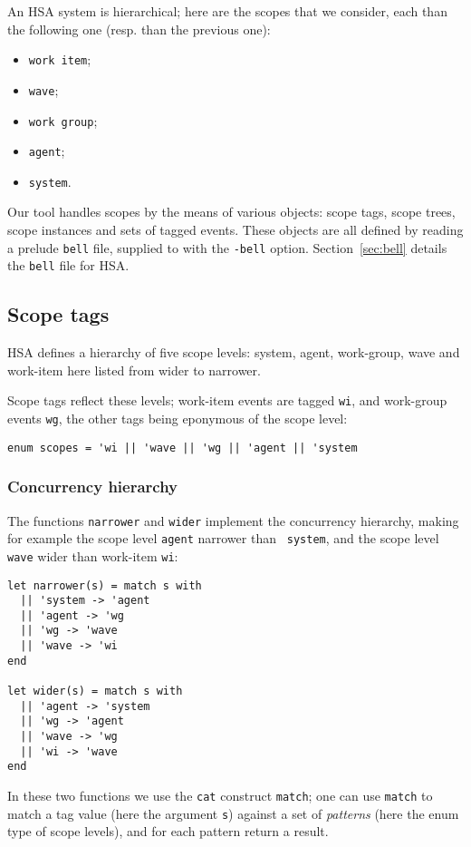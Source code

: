 An HSA system is hierarchical; here are the scopes that we consider, each
\narrower{} than the following one (resp. \wider{} than the previous one):
\begin{itemize}
\item {\tt work item};
\item {\tt wave};
\item {\tt work group};
\item {\tt agent};
\item {\tt system}. 
\end{itemize} 

Our  tool handles scopes by the means of various objects: scope
tags, scope trees, scope instances and sets of tagged events. These objects are
all defined by reading a prelude {\tt bell} file, supplied to \herd{} with the
\texttt{-bell} option. Section~\ref{sec:bell} details the {\tt bell} file for
HSA.

\subsection{Scope tags}
HSA defines a hierarchy of five scope levels: system, agent, work-group, wave
and work-item here listed from wider to narrower.

Scope tags reflect these levels; work-item events are tagged {\tt wi}, and
work-group events {\tt wg}, the other tags being eponymous of the scope level:
\begin{verbatim}
enum scopes = 'wi || 'wave || 'wg || 'agent || 'system
\end{verbatim}

\subsubsection{Concurrency hierarchy}

The functions {\tt narrower} and {\tt wider} implement the concurrency
hierarchy, making for example the scope level {\tt agent} narrower than {\tt
system}, and the scope level {\tt wave} wider than work-item {\tt wi}:
\begin{verbatim}
let narrower(s) = match s with
  || 'system -> 'agent
  || 'agent -> 'wg
  || 'wg -> 'wave
  || 'wave -> 'wi
end

let wider(s) = match s with
  || 'agent -> 'system
  || 'wg -> 'agent
  || 'wave -> 'wg
  || 'wi -> 'wave
end
\end{verbatim}

In these two functions we use the {\tt cat} construct {\tt match}; one can use
{\tt match} to match a tag value (here the argument {\tt s}) against a set of
\emph{patterns} (here the enum type of scope levels), and for each pattern
return a result.


